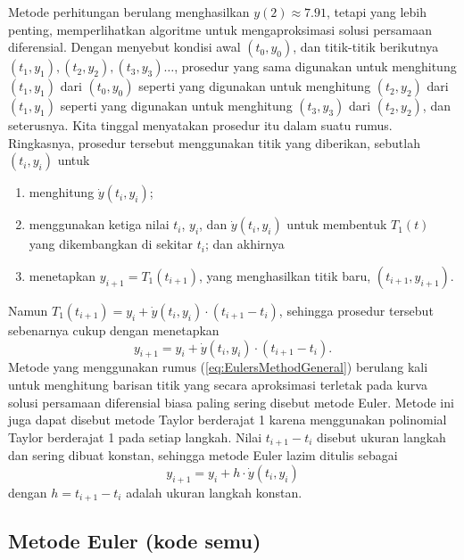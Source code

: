 Metode perhitungan berulang menghasilkan $y(2)\approx7.91$, tetapi
yang lebih penting, memperlihatkan algoritme untuk mengaproksimasi
solusi persamaan diferensial. Dengan menyebut kondisi awal $(t_{0},y_{0})$,
dan titik-titik berikutnya $(t_{1},y_{1}),$$(t_{2},y_{2}),$$(t_{3},y_{3})\ldots$,
prosedur yang sama digunakan untuk menghitung $(t_{1},y_{1})$ dari
$(t_{0},y_{0})$ seperti yang digunakan untuk menghitung $(t_{2},y_{2})$
dari $(t_{1},y_{1})$ seperti yang digunakan untuk menghitung $(t_{3},y_{3})$
dari $(t_{2},y_{2})$, dan seterusnya. Kita tinggal menyatakan prosedur
itu dalam suatu rumus. Ringkasnya, prosedur tersebut menggunakan titik
yang diberikan, sebutlah $(t_{i},y_{i})$ untuk 
\begin{enumerate}
\item menghitung $\dot{y}(t_{i},y_{i})$;
\item menggunakan ketiga nilai $t_{i}$, $y_{i}$, dan $\dot{y}(t_{i},y_{i})$
untuk membentuk $T_{1}(t)$ yang dikembangkan di sekitar $t_{i}$;
dan akhirnya
\item menetapkan $y_{i+1}=T_{1}(t_{i+1})$, yang menghasilkan titik baru,
$(t_{i+1},y_{i+1})$.
\end{enumerate}
Namun $T_{1}(t_{i+1})=y_{i}+\dot{y}(t_{i},y_{i})\cdot(t_{i+1}-t_{i})$,
sehingga prosedur tersebut sebenarnya cukup dengan menetapkan
\begin{equation}
y_{i+1}=y_{i}+\dot{y}(t_{i},y_{i})\cdot(t_{i+1}-t_{i}).\label{eq:EulersMethodGeneral}
\end{equation}
Metode yang menggunakan rumus (\ref{eq:EulersMethodGeneral}) berulang
kali untuk menghitung barisan titik yang secara aproksimasi terletak
pada kurva solusi persamaan diferensial biasa paling sering disebut
metode Euler.\cite{butcher}
Metode ini juga dapat disebut metode Taylor berderajat 1 karena menggunakan
polinomial Taylor berderajat 1 pada setiap langkah. Nilai $t_{i+1}-t_{i}$
disebut ukuran langkah dan sering dibuat konstan, sehingga metode
Euler lazim ditulis sebagai
\begin{equation}
y_{i+1}=y_{i}+h\cdot\dot{y}(t_{i},y_{i})\label{eq:EulersMethodConstantStepSize}
\end{equation}
dengan $h=t_{i+1}-t_{i}$ adalah ukuran langkah konstan. 

\subsection{Metode Euler (kode semu)}

